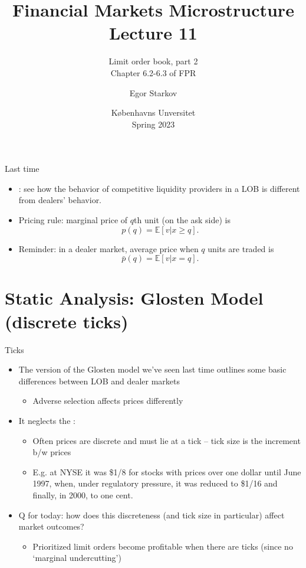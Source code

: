 \documentclass[english,10pt
,aspectratio=169
]{beamer}
\title{Financial Markets Microstructure \\ Lecture 11}
\subtitle{Limit order book, part 2\\
	Chapter 6.2-6.3 of FPR}
\author{Egor Starkov}
\date{K{\o}benhavns Unversitet \\
	Spring 2023}
\begin{document}
\frame[plain]{\titlepage}


\begin{frame}{Last time}
	\begin{itemize}
		\item {}: see how the behavior of competitive liquidity providers in a LOB is different from dealers' behavior.
		\item Pricing rule: \alert{marginal price} of $q$th unit (on the ask side) is $$p(q) = \mathbb{E} [v | x \geq q].$$
		\item Reminder: in a dealer market, average price when $q$ units are traded is $$\bar{p}(q) = \mathbb{E} [v | x = q].$$
	\end{itemize}
\end{frame}


\section{Static Analysis: Glosten Model (discrete ticks)}

\begin{frame}{Ticks}
	\begin{itemize}
		\item The version of the Glosten model we've seen last time outlines some basic differences between LOB and dealer markets
		\begin{itemize}
			\item Adverse selection affects prices differently
		\end{itemize}
		\item It neglects the :
		\begin{itemize}
			\item Often prices are discrete and must lie at a tick --  tick size is the increment b/w prices
			\item E.g. at NYSE it was \$1/8 for stocks with prices over one dollar until June 1997, when, under regulatory pressure, it was reduced to \$1/16 and finally, in 2000, to one cent.
		\end{itemize}
		\item Q for today: how does this discreteness (and tick size in particular) affect market outcomes?
		\begin{itemize}
			\item Prioritized limit orders become profitable when there are ticks (since no `marginal undercutting')
		\end{itemize}
	\end{itemize}
\end{frame}
\end{document}
